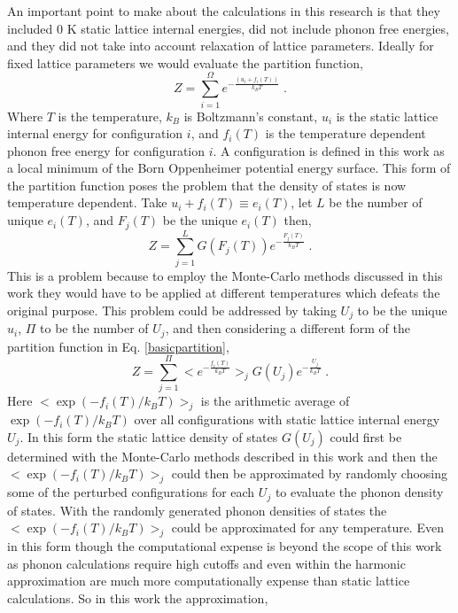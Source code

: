\documentclass[aps,pre,reprint,superscriptaddress,showkeys]{revtex4-2}
\begin{document}
  An important point to make about the calculations in this research is that they  included 0 K static lattice internal energies, did not include phonon free energies, and they did not take into account relaxation of lattice parameters\cite{Holzwarth_group}. Ideally for fixed lattice parameters we would evaluate the partition function\cite{partition}, 
\begin{equation}
Z = \sum_{i=1}^{\Omega} e^{-\frac{(u_i + f_i(T))}{k_BT}}\;.
\label{basicpartition}
\end{equation}
 Where $T$ is the temperature, $k_B$ is Boltzmann's constant, $u_i$ is the static lattice internal energy for configuration $i$, and $f_i(T)$ is the temperature dependent phonon free energy for configuration $i$. A configuration is defined in this work as a local minimum of the Born Oppenheimer potential energy surface. This form of the partition function poses the problem that the density of states is now temperature dependent.  Take $u_i + f_i(T)\equiv e_i(T)$, let $L$ be the number of unique $e_i(T)$, and $F_j(T)$ be the unique $e_i(T)$ then, 
 \begin{equation}
 Z = \sum_{j=1}^{L}G(F_j(T))e^{-\frac{F_j(T)}{k_BT}}\;.
 \end{equation}
 This is a problem because to employ the Monte-Carlo methods discussed in this work they would have to be applied at different temperatures which defeats the original purpose. This problem could be addressed by taking $U_j$ to be the unique $u_i$, $\Pi$ to be the number of $U_j$, and then considering a different form of the partition function in Eq. \ref{basicpartition}, 
 \begin{equation}
 Z= \sum_{j=1}^{\Pi}<e^{-\frac{f_i(T)}{k_BT}}>_jG(U_j)e^{-\frac{U_j}{k_BT}}\;.
 \end{equation}
 Here $<\exp(-f_i(T)/k_BT)>_j$ is the arithmetic average of $\exp(-f_i(T)/k_BT)$ over all configurations with static lattice internal energy $U_j$. In this form the static lattice density of states $G(U_j)$ could first be determined with the Monte-Carlo methods described in this work and then the $<\exp(-f_i(T)/k_BT)>_j$ could then be approximated by randomly choosing some of the perturbed configurations for each $U_j$ to evaluate the phonon density of states. With the randomly generated phonon densities of states the $<\exp(-f_i(T)/k_BT)>_j$ could be approximated for any temperature. Even in this form though the computational expense is beyond the scope of this work as phonon calculations require high cutoffs and even within the harmonic approximation are much more computationally expense than static lattice calculations\cite{dfpt_phonons}. So in this work the approximation, 
\end{document}
